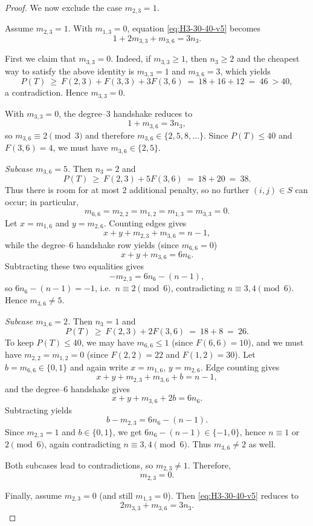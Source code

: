 \documentclass[preprint,12pt]{elsarticle}
\begin{document}
\begin{proof}

\medskip
We now exclude the case $m_{2,3}=1$.

Assume $m_{2,3}=1$. With $m_{1,3}=0$, equation \eqref{eq:H3-30-40-v5} becomes
\[
1+2m_{3,3}+m_{3,6}=3n_3.
\]

First we claim that $m_{3,3}=0$.
Indeed, if $m_{3,3}\ge 1$, then $n_3\ge 2$ and the cheapest way to satisfy the
above identity is $m_{3,3}=1$ and $m_{3,6}=3$, which yields
\[
P(T)\ \ge\ F(2,3)+F(3,3)+3F(3,6)
\ =\ 18+16+12\ =\ 46\ >40,
\]
a contradiction. Hence $m_{3,3}=0$.

With $m_{3,3}=0$, the degree--$3$ handshake reduces to
\[
1+m_{3,6}=3n_3,
\]
so $m_{3,6}\equiv 2\pmod 3$ and therefore $m_{3,6}\in\{2,5,8,\dots\}$.
Since $P(T)\le 40$ and $F(3,6)=4$, we must have $m_{3,6}\in\{2,5\}$.

\smallskip
\noindent
\emph{Subcase $m_{3,6}=5$.}
Then $n_3=2$ and
\[
P(T)\ \ge\ F(2,3)+5F(3,6)\ =\ 18+20\ =\ 38.
\]
Thus there is room for at most $2$ additional penalty, so no further $(i,j)\in S$
can occur; in particular,
\[
m_{6,6}=m_{2,2}=m_{1,2}=m_{1,3}=m_{3,3}=0.
\]
Let $x=m_{1,6}$ and $y=m_{2,6}$.
Counting edges gives
\[
x+y+m_{2,3}+m_{3,6}=n-1,
\]
while the degree--$6$ handshake row yields (since $m_{6,6}=0$)
\[
x+y+m_{3,6}=6n_6.
\]
Subtracting these two equalities gives
\[
-m_{2,3}=6n_6-(n-1),
\]
so $6n_6-(n-1)=-1$, i.e.\ $n\equiv 2\pmod 6$, contradicting $n\equiv 3,4\pmod 6$.
Hence $m_{3,6}\neq 5$.

\smallskip
\noindent
\emph{Subcase $m_{3,6}=2$.}
Then $n_3=1$ and
\[
P(T)\ \ge\ F(2,3)+2F(3,6)\ =\ 18+8\ =\ 26.
\]
To keep $P(T)\le 40$, we may have $m_{6,6}\le 1$ (since $F(6,6)=10$),
and we must have $m_{2,2}=m_{1,2}=0$ (since $F(2,2)=22$ and $F(1,2)=30$).
Let $b=m_{6,6}\in\{0,1\}$ and again write $x=m_{1,6}$, $y=m_{2,6}$.
Edge counting gives
\[
x+y+m_{2,3}+m_{3,6}+b=n-1,
\]
and the degree--$6$ handshake gives
\[
x+y+m_{3,6}+2b=6n_6.
\]
Subtracting yields
\[
b-m_{2,3}=6n_6-(n-1).
\]
Since $m_{2,3}=1$ and $b\in\{0,1\}$, we get $6n_6-(n-1)\in\{-1,0\}$, hence
$n\equiv 1$ or $2\pmod 6$, again contradicting $n\equiv 3,4\pmod 6$.
Thus $m_{3,6}\neq 2$ as well.

\smallskip
Both subcases lead to contradictions, so $m_{2,3}\neq 1$.
Therefore,
\[
m_{2,3}=0.
\]




\smallskip
\noindent
Finally, assume $m_{2,3}=0$ (and still $m_{1,3}=0$).
Then \eqref{eq:H3-30-40-v5} reduces to
\[
2m_{3,3}+m_{3,6}=3n_3.
\]


\end{proof}
\end{document}
